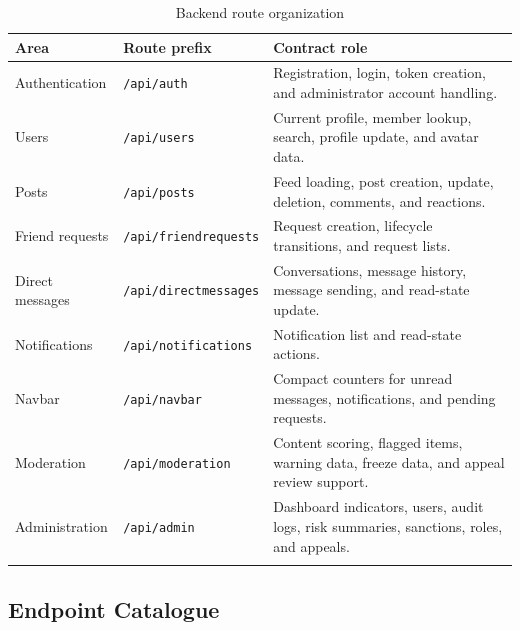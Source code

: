 \begin{longtable}{|m{3.3cm}|m{3.9cm}|m{6.1cm}|}
\hline
\textbf{Area} & \textbf{Route prefix} & \textbf{Contract role} \\
\hline
Authentication & \texttt{/api/auth} & Registration, login, token creation, and administrator account handling. \\
\hline
Users & \texttt{/api/users} & Current profile, member lookup, search, profile update, and avatar data. \\
\hline
Posts & \texttt{/api/posts} & Feed loading, post creation, update, deletion, comments, and reactions. \\
\hline
Friend requests & \texttt{/api/friendrequests} & Request creation, lifecycle transitions, and request lists. \\
\hline
Direct messages & \texttt{/api/directmessages} & Conversations, message history, message sending, and read-state update. \\
\hline
Notifications & \texttt{/api/notifications} & Notification list and read-state actions. \\
\hline
Navbar & \texttt{/api/navbar} & Compact counters for unread messages, notifications, and pending requests. \\
\hline
Moderation & \texttt{/api/moderation} & Content scoring, flagged items, warning data, freeze data, and appeal review support. \\
\hline
Administration & \texttt{/api/admin} & Dashboard indicators, users, audit logs, risk summaries, sanctions, roles, and appeals. \\
\hline
\caption{Backend route organization}
\end{longtable}

\subsection*{Endpoint Catalogue}

